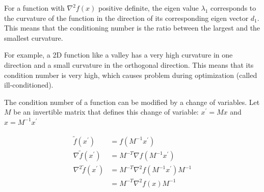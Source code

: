 For a function with $\nabla^2 f(x)$ positive definite, the eigen value $\lambda_1$ corresponds to the curvature of the function in the direction of its corresponding eigen vector $d_1$. This means that the conditioning number is the ratio between the largest and the smallest curvature.

For example, a 2D function like a valley has a very high curvature in one direction and a small curvature in the orthogonal direction. This means that its condition number is very high, which causes problem during optimization (called ill-conditioned).

The condition number of a function can be modified by a change of variables. Let $M$ be an invertible matrix that defines this change of variable: $x^{\prime}=Mx$ and $x=M^{-1}x^{\prime}$

\begin{equation}
    \begin{split}
        \tilde{f}(x^{\prime}) & = f(M^{-1}x^{\prime}) \\
        \nabla\tilde{f}(x^{\prime}) & = M^{-T}\nabla f(M^{-1}x^{\prime}) \\
        \nabla^2\tilde{f}(x^{\prime}) & = M^{-T}\nabla^2 f(M^{-1}x^{\prime})M^{-1} \\
        & = M^{-T}\nabla^2 f(x)M^{-1}
    \end{split}
\end{equation}